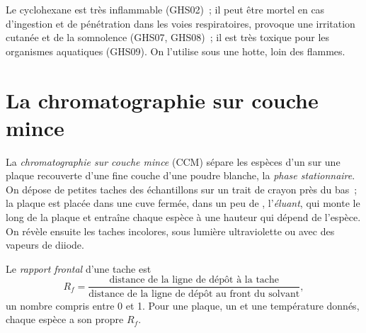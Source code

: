 \begin{safety}{}
Le cyclohexane est très inflammable (GHS02)~; il peut être mortel en cas
d'ingestion et de pénétration dans les voies respiratoires, provoque une
irritation cutanée et de la somnolence (GHS07, GHS08)~; il est très
toxique pour les organismes aquatiques (GHS09). On l'utilise sous une
hotte, loin des flammes.
\end{safety}

\section{La chromatographie sur couche mince}

\begin{definition}\label{def:g10:chemical-species:tlc}
La \emph{chromatographie sur couche mince}
(CCM) sépare les espèces d'un  sur une plaque recouverte d'une
fine couche d'une poudre blanche, la \emph{phase stationnaire}.
On dépose de petites taches des échantillons sur un trait de crayon
près du bas~; la plaque est placée dans une cuve fermée, dans un peu de
, l'\emph{éluant}, qui monte le long de la plaque et
entraîne chaque espèce à une hauteur qui dépend de l'espèce. On révèle
ensuite les taches incolores, sous lumière ultraviolette ou avec des
vapeurs de diiode.
\end{definition}

\begin{definition}\label{def:g10:chemical-species:retention-factor}
Le \emph{rapport frontal} d'une tache est
\[
  R_f = \frac{\text{distance de la ligne de dépôt à la tache}}
             {\text{distance de la ligne de dépôt au front du solvant}},
\]
un nombre compris entre 0 et 1. Pour une plaque, un  et une
température donnés, chaque espèce a son propre $R_f$.
\end{definition}

